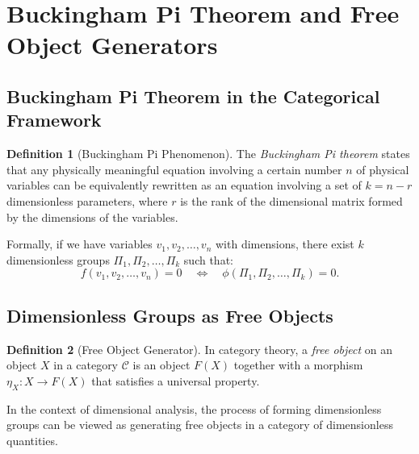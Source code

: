 \documentclass{article}
\theoremstyle{definition}
\newtheorem{definition}{Definition}[section]
\theoremstyle{remark}
\begin{document}
	\section{Buckingham Pi Theorem and Free Object Generators}
	
	\subsection{Buckingham Pi Theorem in the Categorical Framework}
	
	\begin{definition}[Buckingham Pi Phenomenon]
		The \emph{Buckingham Pi theorem} states that any physically meaningful equation involving a certain number $n$ of physical variables can be equivalently rewritten as an equation involving a set of $k = n - r$ dimensionless parameters, where $r$ is the rank of the dimensional matrix formed by the dimensions of the variables.
		
		Formally, if we have variables $v_1, v_2, \dots, v_n$ with dimensions, there exist $k$ dimensionless groups $\Pi_1, \Pi_2, \dots, \Pi_k$ such that:
		\[
		f(v_1, v_2, \dots, v_n) = 0 \quad \iff \quad \phi(\Pi_1, \Pi_2, \dots, \Pi_k) = 0.
		\]
	\end{definition}
	
	\subsection{Dimensionless Groups as Free Objects}
	
	\begin{definition}[Free Object Generator]
		In category theory, a \emph{free object} on an object $X$ in a category $\mathcal{C}$ is an object $F(X)$ together with a morphism $\eta_X: X \rightarrow F(X)$ that satisfies a universal property.
		
		In the context of dimensional analysis, the process of forming dimensionless groups can be viewed as generating free objects in a category of dimensionless quantities.
	\end{definition}
	
\end{document}
